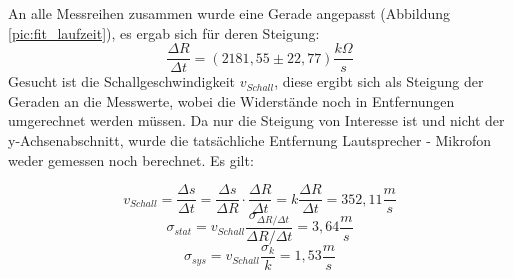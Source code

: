 \documentclass[12pt,a4paper]{article}
\begin{document}
An alle Messreihen zusammen wurde eine Gerade angepasst (Abbildung \ref{pic:fit_laufzeit}), es ergab sich für deren Steigung:
\begin{equation}
\frac{\Delta R}{\Delta t} = (2181,55 \pm 22,77) \frac{k\Omega}{s}
\end{equation} 
Gesucht ist die Schallgeschwindigkeit $v_{Schall}$, diese ergibt sich als Steigung der Geraden an die Messwerte, wobei die Widerstände noch in Entfernungen umgerechnet werden müssen. Da nur die Steigung von Interesse ist und nicht der y-Achsenabschnitt, wurde die tatsächliche  Entfernung Lautsprecher - Mikrofon weder gemessen noch berechnet. Es gilt:

\begin{equation}
v_{Schall} = \frac{\Delta s}{\Delta t} = \frac{\Delta s}{\Delta R} \cdot \frac{\Delta R}{\Delta t} = k \frac{\Delta R}{\Delta t} = 352,11 \frac{m}{s}
\end{equation}
\begin{equation}
\sigma_{stat} = v_{Schall} \frac{\sigma _{\Delta R / \Delta t}}{\Delta R / \Delta t} = 3,64 \frac{m}{s}
\end{equation}
\begin{equation}
\sigma_{sys} = v_{Schall} \frac{\sigma _k}{k} = 1,53 \frac{m}{s}
\end{equation}
\end{document}
